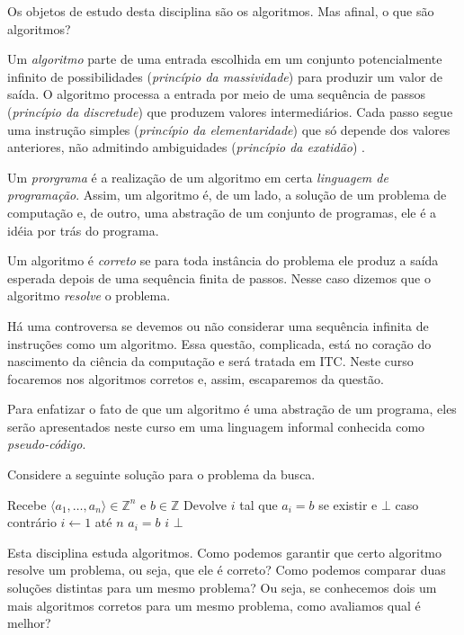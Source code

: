 Os objetos de estudo desta disciplina são os algoritmos.
Mas afinal, o que são algoritmos?

Um {\em algoritmo} parte de uma entrada escolhida em um conjunto potencialmente infinito de possibilidades ({\em princípio da massividade}) para produzir um valor de saída.
O algoritmo processa a entrada por meio de uma sequência de passos ({\em princípio da discretude}) que produzem valores intermediários.
Cada passo  segue uma instrução simples ({\em princípio da elementaridade}) que só depende dos valores anteriores, não admitindo ambiguidades ({\em princípio da exatidão}) \cite{malcev70}.

Um {\em prorgrama} é a realização de um algoritmo em certa {\em linguagem de programação}.
Assim, um algoritmo é, de um lado, a solução de um problema de computação e, de outro, uma abstração de um conjunto de programas, ele é a idéia por trás do programa.

Um algoritmo é {\em correto} se para toda instância do problema ele produz a saída esperada depois de uma sequência finita de passos.
Nesse caso dizemos que o algoritmo {\em resolve} o problema.

Há uma controversa se devemos ou não considerar uma sequência infinita de instruções como um algoritmo.
Essa questão, complicada, está no coração do nascimento da ciência da computação e será tratada em ITC.
Neste curso focaremos nos algoritmos corretos e, assim, escaparemos da questão.

Para enfatizar o fato de que um algoritmo é uma abstração de um programa, eles serão apresentados neste curso em uma linguagem informal conhecida como {\em pseudo-código}.

\begin{example}
  Considere a seguinte solução para o problema da busca.

\begin{codebox}
\li \Comment Recebe $\langle a_1, \dots, a_n \rangle \in \mathbb{Z}^n$ e $b \in \mathbb{Z}$
\li \Comment Devolve $i$ tal que $a_i = b$ se existir e $\bot$ caso contrário
\li \For $i \gets 1$ até $n$
\li \Do \If $a_i = b$
\li     \Then \Return $i$
        \End
    \End
\li \Return $\bot$
\End
\end{codebox}
  
\end{example}

Esta disciplina estuda algoritmos.
Como podemos garantir que certo algoritmo resolve um problema, ou seja, que ele é correto?
Como podemos comparar duas soluções distintas para um mesmo problema?
Ou seja, se conhecemos dois um mais algoritmos corretos para um mesmo problema, como avaliamos qual é melhor?

